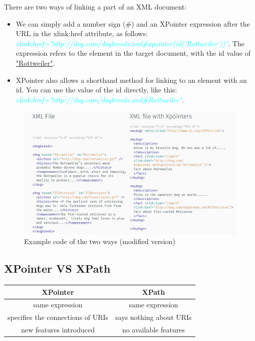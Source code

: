 \documentclass[11pt]{article}
\begin{document}
There are two ways of linking a part of an XML document:
\begin{itemize}
\item We can simply add a number sign (\#) and an XPointer expression after the URL in the xlink:href attribute, as follows:
\textcolor{cyan}{\textit{xlink:href="http://dog.com/dogbreeds.xml\#xpointer(id('Rottweiler'))"}}. The expression refers to the element in the target document, with the id value of \underline{"Rottweiler"}.
\item XPointer also allows a shorthand method for linking to an element with an id. You can use the value of the id directly, like this: \textcolor{cyan}{\textit{xlink:href="http://dog.com/dogbreeds.xml\#Rottweiler"}}.
\end{itemize}
\begin{figure}[!htb]
\centering
  \includegraphics[width=.9\linewidth]{images/xpointerExample}
  \caption{Example code of the two ways (modified version) \cite{W3CSchools}}
  \label{fig:xpointerExample}
\end{figure}
\FloatBarrier

\subsection{XPointer VS XPath}

\begin{table}[!htb]
\centering
 \begin{tabular}{||c || c||} 
 \hline
 \textbf{XPointer} & \textbf{XPath}\\ [0.5ex] 
 \hline
 same expression & same expression\\ 
 \hline
 specifies the connections of URIs & says nothing about URIs \\
 \hline
 new features introduced & no available features \\
 \hline
\end{tabular}
\end{table}
\FloatBarrier
\end{document}
